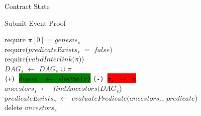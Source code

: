 \begin{algorithm}[H]
    \caption{Contract State}
    \label{algo:hash_and_resubmit_data}
\end{algorithm}


\begin{algorithm}[H]
    \caption{Submit Event Proof}
    \label{algo:hash_and_resubmit_submit}
    require $\pi[0]$ = $genesis_{s}$ \\
    require($predicateExists_{s}$ $=$ $false$) \\
    require($validInterlink(\pi$))\\
    $DAG_{s}$ $\leftarrow$ $DAG_{s}$ $\cup$ $\pi$\\
    \texttt{(+) \colorbox{green}{$digest^{\pi}$ $\leftarrow$ sha256($\pi$)}}
    \texttt{(-) \colorbox{red}{$\pi{_s}$ $\leftarrow$ $\pi$}}
    \\
    $ancestors_{s}$ $\leftarrow$ $findAncestors(DAG_{s}$)\\
    $predicateExists_{s}$ $\leftarrow$ $evaluatePredicate(ancestors_{s}$,
    $predicate$)\\
    delete $ancestors_{s}$\\
\end{algorithm}

\vspace{0.1cm}

